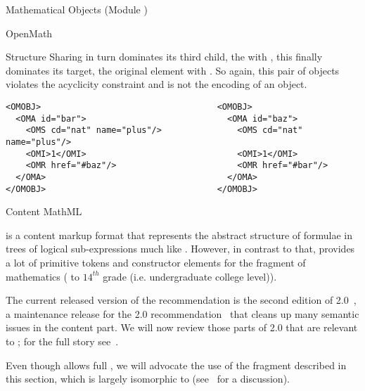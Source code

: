 \begin{tchapter}[id=mobj,short=Mathematical Objects]{Mathematical Objects (Module {})}
\begin{tsection}[id=openmath]{OpenMath}
\begin{tsubsection}[id=om:structure-sharing]{Structure Sharing in {\openmath}}
turn dominates its third child, the {} with
{}, this finally dominates its target, the original
{} element with {}. So again, this pair of
{\openmath} objects violates the acyclicity constraint and is not the {\xml} encoding of
an {\openmath} object.
\begin{lstlisting}[language=OpenMath,numbers=none,label=lst:2cycle,
  caption={A Cycle of Order Two},index={OMOBJ,OMA,OMV}]
<OMOBJ>                                   <OMOBJ>
  <OMA id="bar">                            <OMA id="baz">
    <OMS cd="nat" name="plus"/>               <OMS cd="nat" name="plus"/>
    <OMI>1</OMI>                              <OMI>1</OMI>
    <OMR href="#baz"/>                        <OMR href="#bar"/>
  </OMA>                                    </OMA>
</OMOBJ>                                  </OMOBJ>
\end{lstlisting}
\end{tsubsection}
\end{tsection}

\begin{tsection}[id=cmml]{Content MathML}
  
  {\cmathml} is a content markup format that represents the abstract structure of formulae
  in trees of logical sub-expressions much like {\openmath}.  However, in contrast to that,
  {\cmathml} provides a lot of primitive tokens and constructor elements for the
  {} fragment of mathematics ({} to $14^{th}$ grade
  (i.e. undergraduate college level)).

  The current released version of the {\mathml} recommendation is the second edition of
  {\mathml} 2.0~\cite{CarIon:MathML03}, a maintenance release for the {\mathml} 2.0
  recommendation~\cite{CarIon:MathML01} that cleans up many semantic issues in the content
  {\mathml} part. We will now review those parts of {\mathml} 2.0 that are relevant to
  {\omdoc}; for the full story see~\cite{CarIon:MathML03}.

  Even though {\omdoc} allows full {\cmathml}, we will advocate the use of the {\cmathml}
  fragment described in this section, which is largely isomorphic to {\openmath}
  (see~ for a discussion).


\end{tsection}
\end{tchapter}
